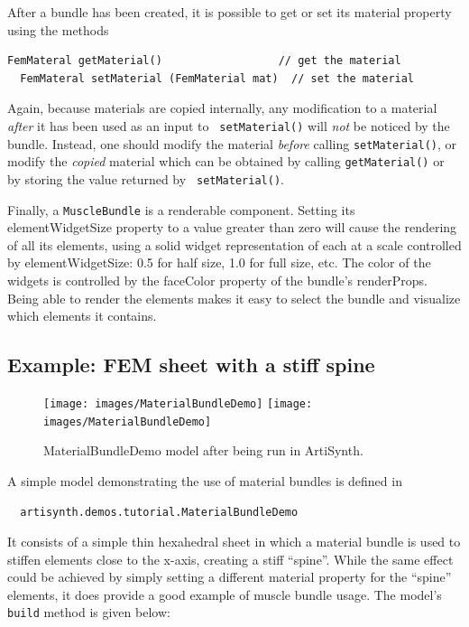 After a bundle has been created, it is possible to get or set
its {\sf material} property using the methods
%
\begin{lstlisting}[]
  FemMateral getMaterial()                  // get the material
  FemMateral setMaterial (FemMaterial mat)  // set the material
\end{lstlisting}
%
Again, because materials are copied internally, any modification to a
material {\it after} it has been used as an input to {\tt
setMaterial()} will {\it not} be noticed by the bundle. Instead, one
should modify the material {\it before} calling {\tt setMaterial()},
or modify the {\it copied} material which can be obtained by calling
{\tt getMaterial()} or by storing the value returned by {\tt
setMaterial()}.

Finally, a {\tt MuscleBundle} is a renderable component. Setting its
{\sf elementWidgetSize} property to a value greater than zero will
cause the rendering of all its elements, using a solid widget
representation of each at a scale controlled by {\sf elementWidgetSize}:
0.5 for half size, 1.0 for full size, etc. The color of the
widgets is controlled by the {\sf faceColor} property of the bundle's
{\sf renderProps}. Being able to render the elements makes it easy to
select the bundle and visualize which elements it contains.

\subsection{Example: FEM sheet with a stiff spine}
\label{MaterialBundleDemo:sec}

\begin{figure}[ht]
\begin{center}
\iflatexml
 \texttt{[image: images/MaterialBundleDemo]}
\else
 \texttt{[image: images/MaterialBundleDemo]}
\fi
\end{center}
\caption{MaterialBundleDemo model after being run in ArtiSynth.}
\label{MaterialBundleDemo:fig}
\end{figure}

A simple model demonstrating the use of material bundles
is defined in
%
\begin{verbatim}
  artisynth.demos.tutorial.MaterialBundleDemo
\end{verbatim}
%
It consists of a simple thin hexahedral sheet in which a material
bundle is used to stiffen elements close to the x-axis,
creating a stiff ``spine''. While the same effect could be achieved by
simply setting a different material property for the ``spine''
elements, it does provide a good example of muscle bundle usage.
%
The model's {\tt build} method is given below:
\lstset{numbers=left}
\iflatexml

\else

\fi
\lstset{numbers=none}

